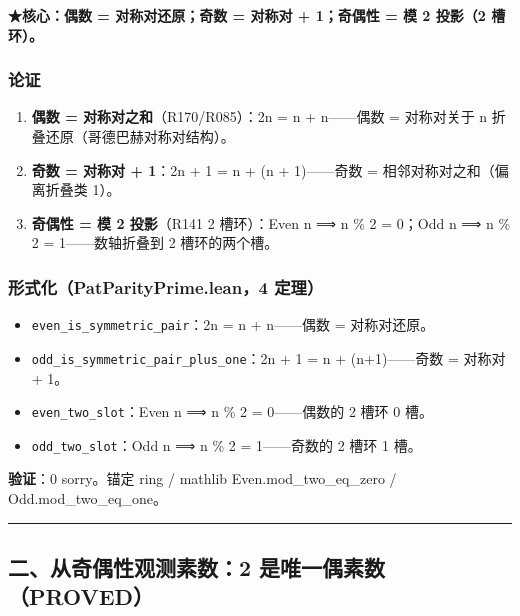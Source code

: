 \documentclass[
]{article}
\providecommand{\tightlist}{%
  \setlength{\itemsep}{0pt}\setlength{\parskip}{0pt}}
\begin{document}
\textbf{★核心：偶数 = 对称对还原；奇数 = 对称对 + 1；奇偶性 = 模 2
投影（2 槽环）。}

\subsubsection{论证}\label{ux8bbaux8bc1}

\begin{enumerate}
\def\labelenumi{\arabic{enumi}.}
\tightlist
\item
  \textbf{偶数 = 对称对之和}（R170/R085）：2n = n + n------偶数 =
  对称对关于 n 折叠还原（哥德巴赫对称对结构）。
\item
  \textbf{奇数 = 对称对 + 1}：2n + 1 = n + (n + 1)------奇数 =
  相邻对称对之和（偏离折叠类 1）。
\item
  \textbf{奇偶性 = 模 2 投影}（R141 2 槽环）：Even n ⟹ n \% 2 = 0；Odd n
  ⟹ n \% 2 = 1------数轴折叠到 2 槽环的两个槽。
\end{enumerate}

\subsubsection{形式化（PatParityPrime.lean，4
定理）}\label{ux5f62ux5f0fux5316patparityprime.lean4-ux5b9aux7406}

\begin{itemize}
\tightlist
\item
  \texttt{even\_is\_symmetric\_pair}：2n = n + n------偶数 =
  对称对还原。
\item
  \texttt{odd\_is\_symmetric\_pair\_plus\_one}：2n + 1 = n +
  (n+1)------奇数 = 对称对 + 1。
\item
  \texttt{even\_two\_slot}：Even n ⟹ n \% 2 = 0------偶数的 2 槽环 0
  槽。
\item
  \texttt{odd\_two\_slot}：Odd n ⟹ n \% 2 = 1------奇数的 2 槽环 1 槽。
\end{itemize}

\textbf{验证}：0 sorry。锚定 ring / mathlib Even.mod\_two\_eq\_zero /
Odd.mod\_two\_eq\_one。

\begin{center}\rule{0.5\linewidth}{0.5pt}\end{center}

\subsection{二、从奇偶性观测素数：2
是唯一偶素数（PROVED）}\label{ux4e8cux4eceux5947ux5076ux6027ux89c2ux6d4bux7d20ux65702-ux662fux552fux4e00ux5076ux7d20ux6570proved}
\end{document}
